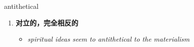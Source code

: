 
\begin{frame}
{\huge antithetical}
\begin{center}
\begin{enumerate}\Large
  \item \textbf{对立的，完全相反的}
  \begin{itemize}
    \item \em{\Large{spiritual ideas seem to antithetical to the materialism}}
  \end{itemize}
\end{enumerate}
\end{center}
\end{frame}
